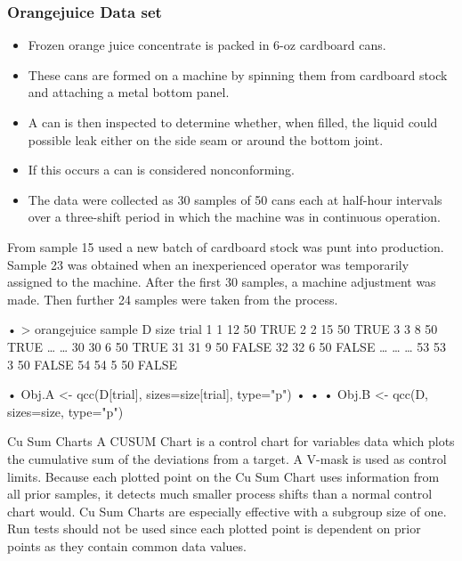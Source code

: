 \begin{frame}
\frametitle{Orangejuice Data set}
\begin{itemize}
\item Frozen orange juice concentrate is packed in 6-oz cardboard cans. 
\item These cans are formed on a machine by spinning them from cardboard stock and attaching a metal bottom panel. 
\item A can is then inspected to determine whether, when filled, the liquid could possible leak either on the side seam or around the bottom joint. 
\item If this occurs a can is considered nonconforming. 
\item The data were collected as 30 samples of 50 cans each at half-hour intervals over a three-shift period in which the machine was in continuous operation. 
\end{itemize}


\end{frame}
\begin{frame}
From sample 15 used a new batch of cardboard stock was punt into production. Sample 23 was obtained when an inexperienced operator was temporarily assigned to the machine. 
After the first 30 samples, a machine adjustment was made. Then further 24 samples were taken from the process.

•	
> orangejuice
   sample  D size trial
1       1 12   50  TRUE
2       2 15   50  TRUE
3       3  8   50  TRUE
…
…
30     30  6   50  TRUE
31     31  9   50 FALSE
32     32  6   50 FALSE
…
…
…
53     53  3   50 FALSE
54     54  5   50 FALSE
\end{frame}
\begin{frame}•	
Obj.A <- qcc(D[trial], sizes=size[trial], type="p")
•	
•	
•	 
Obj.B <- qcc(D, sizes=size, type="p")
\end{frame}
\begin{frame}

Cu Sum Charts
A CUSUM Chart is a control chart for variables data which plots the cumulative sum of the deviations from a target. A V-mask is used as control limits. Because each plotted point on the Cu Sum Chart uses information from all prior samples, it detects much smaller process shifts than a normal control chart would. Cu Sum Charts are especially effective with a subgroup size of one. Run tests should not be used since each plotted point is dependent on prior points as they contain common data values.
\end{frame}
